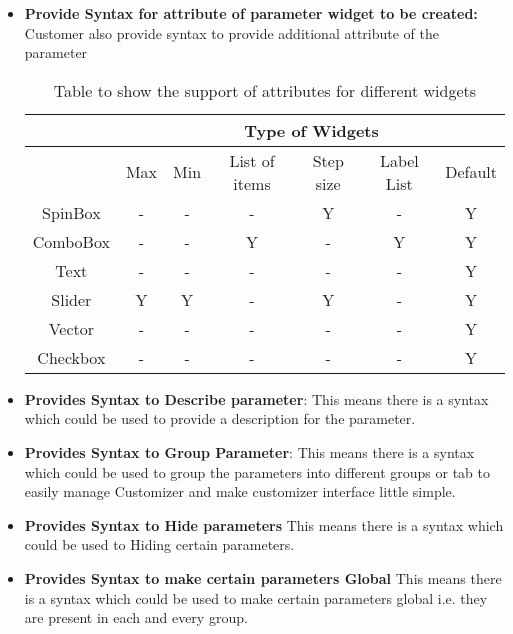 \begin{itemize}
\begin{enumerate}
    \end{enumerate}
   
    \item \textbf{Provide Syntax for attribute of parameter widget to be created:}
    Customer also provide syntax to provide additional attribute of the parameter
   
    \begin{table}[h]
        \centering
        \begin{tabular}{ |c|c|c|c|c|c|c| }
            \hline
            & \multicolumn{6}{|c|}{Type of Widgets} \\
            \hline
            &Max&    Min &    List of items&    Step size&    Label List     &Default     \\ [0.5ex]
            \hline
            SpinBox& -&    -&    -&    Y&     -& Y \\ \hline
            ComboBox&    -&    -&    Y&    -&    Y&Y \\ \hline
            Text&    -&    -&    -&    -&    -&Y \\ \hline
            Slider&    Y&    Y&    -&    Y&    -&Y \\ \hline
            Vector&    -&    -&    -&    -&    -&Y \\ \hline
            Checkbox&    -&    -&    -&    -&    -&Y \\ [1ex]
            \hline
        \end{tabular}
        \caption{Table to show the support of attributes  for different widgets}
        \label{table2}
    \end{table}
   
    \item {\bf Provides Syntax to Describe parameter}:
    This means there is a syntax which could be used to provide a description for the parameter.
   
    \item \textbf{Provides Syntax to Group Parameter}:
    This means there is a syntax which could be used to group the parameters into different groups or tab to easily manage Customizer and make customizer interface little simple.
   
    \item \textbf{Provides Syntax to Hide parameters}
    This means there is a syntax which could be used to Hiding certain parameters.
   
    \item \textbf{Provides Syntax to make certain parameters Global}
    This means there is a syntax which could be used to make certain parameters global i.e. they are present in each and every group.


\end{itemize}
